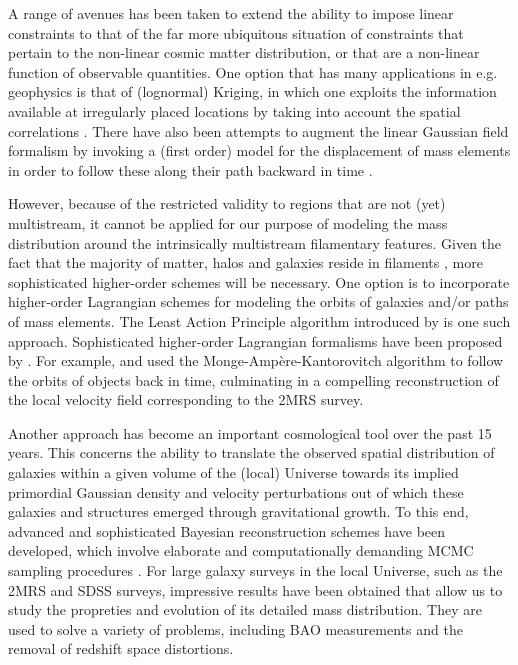 \documentclass[a4paper, 11pt]{article}
\begin{document}
A range of avenues has been taken to extend the ability to impose linear constraints to that of the far more ubiquitous situation of constraints that pertain to the non-linear cosmic matter distribution, or that are a non-linear function of observable quantities. One option that has many applications in e.g. geophysics is that of (lognormal) Kriging, in which one exploits the information available at irregularly placed locations by taking into account the spatial correlations \cite{Platen:2011}. There have also been attempts to augment the linear Gaussian field formalism by invoking a (first order) model for the displacement of mass elements in order to follow these along their path backward in time \citep{Doumler:2013}.

However, because of the restricted validity to regions that are not (yet) multistream, it cannot be applied for our purpose of modeling the mass distribution around the intrinsically multistream filamentary features. Given the fact that the majority of matter, halos and galaxies reside in filaments \citep{cautun2014,ganeshaiah2019}, more sophisticated higher-order schemes will be necessary. One option is to incorporate higher-order Lagrangian schemes for modeling the orbits of galaxies and/or paths of mass elements. The Least Action Principle algorithm introduced by \cite{peebles1983} is one such approach. Sophisticated higher-order Lagrangian formalisms have been proposed by \cite{Mohayaee:2006, Lavaux:2008, Hada:2018, Shi:2018, Zhu:2018}. For example, \cite{Mohayaee:2006} and \cite{Lavaux:2008} used the Monge-Amp\`ere-Kantorovitch algorithm to follow the orbits of objects back in time, culminating in a compelling reconstruction of the local velocity field corresponding to the 2MRS survey. 

Another approach has become an important cosmological tool over the past 15 years. This concerns the ability to translate the observed spatial distribution of galaxies within a given volume of the (local) Universe towards its implied primordial Gaussian density and velocity perturbations out of which these galaxies and structures emerged through gravitational growth. To this end, advanced and sophisticated Bayesian reconstruction schemes have been developed, which involve elaborate and computationally demanding  MCMC sampling procedures \cite{Kitaura:2008,Kitaura:2009, Jasche:2010,Leclercq:2015,Hess:2016, Bos:2016, Leclercq:2017, McAlpine:2022}. For large galaxy surveys in the local Universe, such as the 2MRS and SDSS surveys, impressive results have been obtained that allow us to study the propreties and evolution of its detailed mass distribution. They are used to solve a variety of problems, including BAO measurements and the removal of redshift space distortions. 
\end{document}
